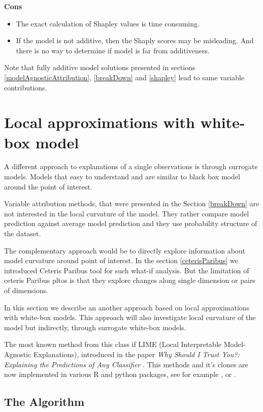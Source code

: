 \documentclass[]{krantz}
\providecommand{\tightlist}{%
  \setlength{\itemsep}{0pt}\setlength{\parskip}{0pt}}
\theoremstyle{definition}
\theoremstyle{definition}
\theoremstyle{definition}
\theoremstyle{remark}
\begin{document}
\textbf{Cons}

\begin{itemize}
\tightlist
\item
  The exact calculation of Shapley values is time consuming.
\item
  If the model is not additive, then the Shaply scores may be
  misleading. And there is no way to determine if model is far from
  additiveness.
\end{itemize}

Note that fully additive model solutions presented in sections
\ref{modelAgnosticAttribution}, \ref{breakDown} and \ref{shapley} lead
to same variable contributions.

\hypertarget{LIME}{%
\section{Local approximations with white-box model}\label{LIME}}

A different approach to explanations of a single observations is through
surrogate models. Models that easy to understand and are similar to
black box model around the point of interest.

Variable attribution methods, that were presented in the Section
\ref{breakDown} are not interested in the local curvature of the model.
They rather compare model prediction against average model prediction
and they use probability structure of the dataset.

The complementary approach would be to directly explore information
about model curvature around point of interest. In the section
\ref{ceterisParibus} we introduced Ceteris Paribus tool for such what-if
analysis. But the limitation of ceteris Paribus pltos is that they
explore changes along single dimension or pairs of dimensions.

In this section we describe an another approach based on local
approximations with white-box models. This approach will also
investigate local curvature of the model but indirectly, through
surrogate white-box models.

The most known method from this class if LIME (Local Interpretable
Model-Agnostic Explanations), introduced in the paper \emph{Why Should I
Trust You?: Explaining the Predictions of Any Classifier} \citep{lime}.
This methods and it's clones are now implemented in various R and python
packages, see for example \citep{R-lime}, \citep{R-live} or
\citep{R-iml}.

\hypertarget{the-algorithm-3}{%
\subsection{The Algorithm}\label{the-algorithm-3}}
\end{document}
